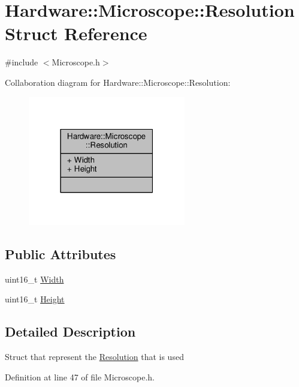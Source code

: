 \hypertarget{struct_hardware_1_1_microscope_1_1_resolution}{}\section{Hardware\+:\+:Microscope\+:\+:Resolution Struct Reference}
\label{struct_hardware_1_1_microscope_1_1_resolution}


{\ttfamily \#include $<$Microscope.\+h$>$}



Collaboration diagram for Hardware\+:\+:Microscope\+:\+:Resolution\+:\nopagebreak
\begin{figure}[H]
\begin{center}
\leavevmode
\includegraphics[width=195pt]{struct_hardware_1_1_microscope_1_1_resolution__coll__graph}
\end{center}
\end{figure}
\subsection*{Public Attributes}
\begin{DoxyCompactItemize}
\item 
uint16\+\_\+t \hyperlink{struct_hardware_1_1_microscope_1_1_resolution_a0e1ef543db0224230559cd9c6531aad2}{Width}
\item 
uint16\+\_\+t \hyperlink{struct_hardware_1_1_microscope_1_1_resolution_aaa54a929acd6e8c224182a97264c85d1}{Height}
\end{DoxyCompactItemize}


\subsection{Detailed Description}
Struct that represent the \hyperlink{struct_hardware_1_1_microscope_1_1_resolution}{Resolution} that is used 

Definition at line 47 of file Microscope.\+h.



